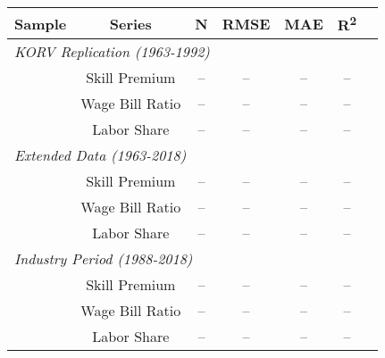 \begin{tabular}{lcccccc}
  \hline\hline
  \textbf{Sample} & \textbf{Series} & \textbf{N} & \textbf{RMSE} & \textbf{MAE} & \textbf{R\textsuperscript{2}} \\ \hline
  \multicolumn{6}{l}{\textit{KORV Replication (1963-1992)}} \\
  & Skill Premium & -- & -- & -- & -- \\
  & Wage Bill Ratio & -- & -- & -- & -- \\
  & Labor Share & -- & -- & -- & -- \\ \hline
  \multicolumn{6}{l}{\textit{Extended Data (1963-2018)}} \\
  & Skill Premium & -- & -- & -- & -- \\
  & Wage Bill Ratio & -- & -- & -- & -- \\
  & Labor Share & -- & -- & -- & -- \\ \hline
  \multicolumn{6}{l}{\textit{Industry Period (1988-2018)}} \\
  & Skill Premium & -- & -- & -- & -- \\
  & Wage Bill Ratio & -- & -- & -- & -- \\
  & Labor Share & -- & -- & -- & -- \\ \hline\hline
\end{tabular}
